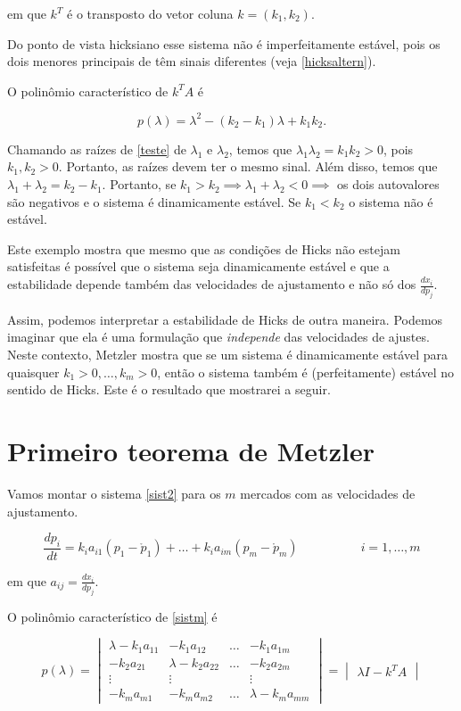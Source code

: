 \documentclass[
	12pt,				%
	openright,			%
	twoside,			%
	a4paper,			%
	english,			%
	french,				%
	spanish,			%
	brazil				%
	]{abntex2}
\newcommand{\espaco}{\hspace{5em}}
\newcommand{\pbola}{\mathring{p}}
\begin{document}
em que $k^T$ é o transposto do vetor coluna $k = (k_1, k_2)$.

Do ponto de vista hicksiano esse sistema não é imperfeitamente estável, pois
os dois menores principais de têm sinais diferentes (veja \ref{hicksaltern}).

O polinômio característico de $k^T A$ é

\begin{equation} \label{teste}
	p(\lambda) = \lambda^2 - (k_2 - k_1)\lambda + k_1k_2.
\end{equation}

Chamando as raízes de \ref{teste} de $\lambda_1$ e $\lambda_2$, temos que $\lambda_1 \lambda_2 = k_1 k_2 > 0$,
pois $k_1, k_2 > 0$. Portanto, as raízes devem ter o mesmo sinal. Além disso, temos que
$\lambda_1 + \lambda_2 = k_2 - k_1$. Portanto, se $k_1 > k_2 \implies \lambda_1 + \lambda_2 < 0
\implies$ os dois autovalores são negativos e o sistema é dinamicamente estável.
Se $k_1 < k_2$ o sistema não é estável.

Este exemplo mostra que mesmo que as condições de Hicks não estejam satisfeitas é
possível que o sistema seja dinamicamente estável e que a estabilidade depende também
das velocidades de ajustamento e não só dos $\frac{dx_i}{dp_j}$.

Assim, podemos interpretar a estabilidade de Hicks de outra maneira. Podemos imaginar
que ela é uma formulação que \textit{independe} das velocidades de ajustes.
Neste contexto, Metzler mostra que se um sistema é dinamicamente estável
para quaisquer $k_1 > 0, \ldots, k_m > 0$, então o sistema também é (perfeitamente) estável no sentido
de Hicks. Este é o resultado que mostrarei a seguir.

\section{Primeiro teorema de Metzler}

Vamos montar o sistema \ref{sist2} para
os $m$ mercados com as velocidades de ajustamento.

\begin{equation} \label{sistm}
		\frac{dp_i}{dt} = k_ia_{i1}(p_1 - \pbola_1) + \ldots + k_ia_{im}(p_m - \pbola_m) \espaco i = 1, \ldots, m
\end{equation}

em que $a_{ij} = \frac{dx_i}{dp_j}$.

O polinômio característico de \ref{sistm} é

\begin{equation} \label{poli}
	p(\lambda) =
	\begin{vmatrix}
		\lambda - k_1a_{11} & -k_1a_{12} & \ldots & -k_1a_{1m} \\
		-k_2a_{21} & \lambda - k_2a_{22} & \ldots & -k_2a_{2m} \\
		\vdots & \vdots & & \vdots \\
		-k_ma_{m1} & -k_m a_{m2} & \ldots & \lambda - k_ma_{mm}
	\end{vmatrix} =
	\begin{vmatrix}
		\lambda I - k^T A
	\end{vmatrix}
\end{equation}
\end{document}
